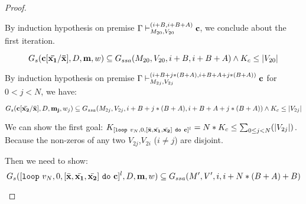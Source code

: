 \documentclass[a4paper,11pt]{article}
\begin{document}
\begin{proof}
\begin{itemize}
By induction hypothesis on premise ${\Gamma \vdash^{(i+B,i+B+A )}_{M_{20}, V_{20}} \mathbf{{c}} }$, we conclude about the first iteration.

\[ G_{s}( \mathbf{{c[\bar{x_1} / \bar{x}]}} ,D,\mathbf{{m}},w) \subseteq G_{ssa}(M_{20}, V_{20} ,i+B, i+B+A) \land K_{   c} \leq |V_{20} |  \]

By induction hypothesis on premise ${\Gamma \vdash^{(i+B+j*(B+A),i+B+A+j*(B+A) )}_{M_{2j}, V_{2j}} \mathbf{{c}} 
}$ for $ 0 <j <N$, we have:

\[ G_{s}( \mathbf{{c[\bar{x_2} / \bar{x}] }},D,\mathbf{{m_j}},w_j) \subseteq G_{ssa}(M_{2j}, V_{2j} ,i+B+j*(B+A), i+B+A+j*(B+A)) \land K_{c} \leq |V_{2j} |  \]

We can show the first goal: $K_{ [\mathtt{loop} ~ v_N, 0, [\bar{\mathbf{{x}}}, \bar{\mathbf{{x_1}}}, \bar{\mathbf{{x_2}}}] ~ \mathtt{do} ~ \mathbf{{c}} ]^{l}} = N* K_{c} \leq \sum_{0\leq j <N}(|V_{2j}|)$. Because the non-zeros of any two $V_{2j}$,$V_{2i}$ ($i \not = j$) are disjoint.

Then we need to show:\[G_{s}( [\mathtt{loop} ~ v_N, 0, [\bar{\mathbf{{x}}}, \bar{\mathbf{{x_1}}}, \bar{\mathbf{{x_2}}}] ~ \mathtt{do} ~ \mathbf{{c}} ]^{l} ,D,\mathbf{{m}},w) \subseteq G_{ssa}(M', V' ,i, i+N*(B+A)+B)\]


\end{itemize}
\end{proof}
\end{document}
